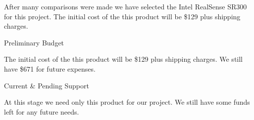 
After many comparisons were made we have selected the Intel RealSense SR300 for this project. The initial cost of the this product will be \$129 plus shipping charges.

{Preliminary Budget}

The initial cost of the this product will be \$129 plus shipping charges. We still have \$671 for future expenses.

{Current \& Pending Support}

At this stage we need only this product for our project. We still have some funds left for any future needs.

